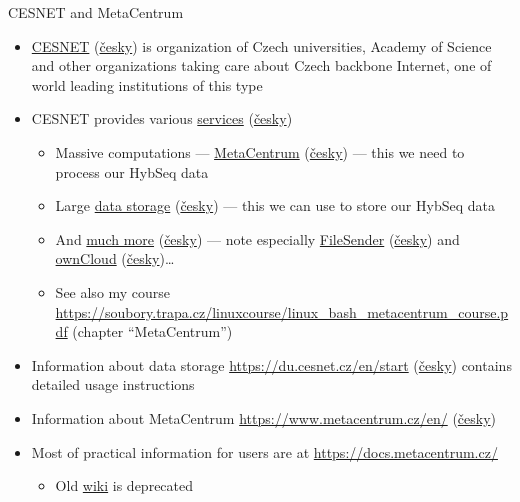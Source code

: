 \documentclass[compress,  xelatex, 11pt, xcolor=x11names, aspectratio=169,
	hyperref={
		bookmarks=true,
		unicode=true,
		colorlinks=true,
		pdftitle={HybSeq course},
		plainpages=false,
		pdfauthor={Vojtech Zeisek},
		pdfsubject={Practical processing of HybSeq target enrichment sequencing data on computing grids like MetaCentrum},
		pdfcreator={XeLaTeX},
		pdfkeywords={BASH, command line, GNU, HybSeq, Linux, MetaCentrum, sequencing shell, target enrichment},
		linkcolor=Turquoise4, %
		anchorcolor=DodgerBlue4, %
		citecolor=DodgerBlue4, %
		filecolor=DodgerBlue4, %
		menucolor=Tan4, %
		urlcolor=DarkOliveGreen4 %
		},
	url={hyphens, lowtilde} %
	]{beamer}
\renewcommand{\alert}[1]{\textcolor{OrangeRed3}{#1}}
\begin{document}
\begin{frame}[allowframebreaks]{CESNET and MetaCentrum}
	\label{CESNET}
	\begin{itemize}
		\item \href{https://www.cesnet.cz/en/}{CESNET} (\href{https://www.cesnet.cz/}{česky}) is organization of Czech universities, Academy of Science and other organizations taking care about Czech backbone Internet, one of world leading institutions of this type
		\item CESNET provides various \href{https://www.cesnet.cz/en/services}{services} (\href{https://www.cesnet.cz/sluzby/}{česky})
		\begin{itemize}
			\item Massive computations --- \href{https://www.cesnet.cz/en/services/computing-2/metacentrum-10}{MetaCentrum} (\href{https://www.cesnet.cz/sluzby/vypocty-2/narocne-vypocty-metacentrum-10}{česky}) --- \alert{this we need to process our HybSeq data}
			\item Large \href{https://www.cesnet.cz/en/services/data-storage-3/data-storage-13}{data storage} (\href{https://www.cesnet.cz/sluzby/datova-uloziste-3/datova-uloziste-13}{česky}) --- \alert{this we can use to store our HybSeq data}
			\item And \href{https://www.cesnet.cz/en/services}{much more} (\href{https://www.cesnet.cz/sluzby/}{česky}) --- note especially \href{https://www.cesnet.cz/en/services/data-storage-3/filesender-15}{FileSender} (\href{https://www.cesnet.cz/sluzby/datova-uloziste-3/filesender-15}{česky}) and \href{https://www.cesnet.cz/en/services/data-storage-3/owncloud-16}{ownCloud} (\href{https://www.cesnet.cz/sluzby/datova-uloziste-3/owncloud-16}{česky})\ldots
			\item See also my course \url{https://soubory.trapa.cz/linuxcourse/linux_bash_metacentrum_course.pdf} (chapter \enquote{MetaCentrum})
		\end{itemize}
		\item Information about data storage \url{https://du.cesnet.cz/en/start} (\href{https://du.cesnet.cz/cs/start}{česky}) contains detailed usage instructions
		\item Information about MetaCentrum \url{https://www.metacentrum.cz/en/} (\href{https://www.metacentrum.cz/cs/}{česky})
		\item Most of practical information for users are at \url{https://docs.metacentrum.cz/}
		\begin{itemize}
			\item Old \href{https://wiki.metacentrum.cz/}{wiki} is deprecated

\end{itemize}
\end{itemize}
\end{frame}
\end{document}
